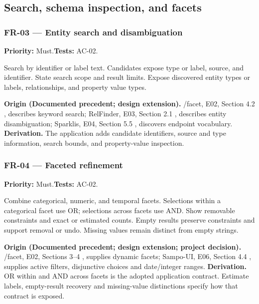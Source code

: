 \documentclass[11pt,a4paper]{article}
\newcommand{\req}[4]{\subsubsection*{#1 --- #2}\phantomsection\label{req:#1}\textbf{Priority:} #3.\quad\textbf{Tests:} #4.\par}
\newcommand{\origin}[3]{\par{\small\textbf{Origin (#1).} #2 \textbf{Derivation.} #3\par}}
\begin{document}
\subsection{Search, schema inspection, and facets}
\par\noindent\begin{minipage}{\linewidth}
\req{FR-03}{Entity search and disambiguation}{Must}{AC-02}
Search by identifier or label text. Candidates expose type or label, source, and identifier. State search scope and result limits. Expose discovered entity types or labels, relationships, and property value types.
\origin{Documented precedent; design extension}{/facet, E02, Section 4.2 \citep{facet}, describes keyword search; RelFinder, E03, Section 2.1 \citep{relfinder}, describes entity disambiguation; Sparklis, E04, Section 5.5 \citep{sparklis}, discovers endpoint vocabulary.}{The application adds candidate identifiers, source and type information, search bounds, and property-value inspection.}
\end{minipage}\par
\par\noindent\begin{minipage}{\linewidth}
\req{FR-04}{Faceted refinement}{Must}{AC-02}
Combine categorical, numeric, and temporal facets. Selections within a categorical facet use OR; selections across facets use AND. Show removable constraints and exact or estimated counts. Empty results preserve constraints and support removal or undo. Missing values remain distinct from empty strings.
\origin{Documented precedent; design extension; project decision}{/facet, E02, Sections 3--4 \citep{facet}, supplies dynamic facets; Sampo-UI, E06, Section 4.4 \citep{sampoui}, supplies active filters, disjunctive choices and date/integer ranges.}{OR within and AND across facets is the adopted application contract. Estimate labels, empty-result recovery and missing-value distinctions specify how that contract is exposed.}
\end{minipage}\par
\end{document}
